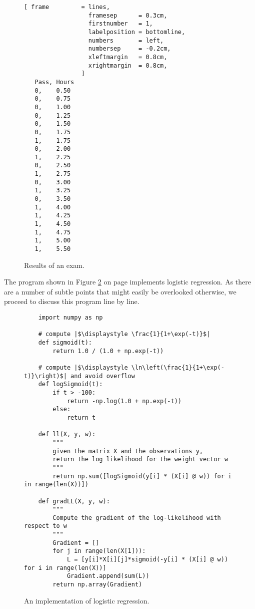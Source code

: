\begin{figure}[!ht]
\centering
\begin{Verbatim}[ frame         = lines, 
                  framesep      = 0.3cm, 
                  firstnumber   = 1,
                  labelposition = bottomline,
                  numbers       = left,
                  numbersep     = -0.2cm,
                  xleftmargin   = 0.8cm,
                  xrightmargin  = 0.8cm,
                ]
   Pass, Hours
   0,    0.50
   0,    0.75
   0,    1.00
   0,    1.25
   0,    1.50
   0,    1.75
   1,    1.75
   0,    2.00
   1,    2.25
   0,    2.50
   1,    2.75
   0,    3.00
   1,    3.25
   0,    3.50
   1,    4.00
   1,    4.25
   1,    4.50
   1,    4.75
   1,    5.00
   1,    5.50
\end{Verbatim}
\vspace*{-0.3cm}
\caption{Results of an exam.}
\label{fig:exam.csv}
\end{figure}

The program shown in Figure \ref{fig:logistic_regression.py} on page
\pageref{fig:logistic_regression.py} implements logistic regression.  As there are a number of
subtle points that might easily be overlooked otherwise, we proceed to discuss this program line by line. 


\begin{figure}[!ht]
\centering

\begin{verbatim}
    import numpy as np
    
    # compute |$\displaystyle \frac{1}{1+\exp(-t)}$|
    def sigmoid(t):
        return 1.0 / (1.0 + np.exp(-t))
    
    # compute |$\displaystyle \ln\left(\frac{1}{1+\exp(-t)}\right)$| and avoid overflow
    def logSigmoid(t):
        if t > -100:
            return -np.log(1.0 + np.exp(-t))
        else:
            return t
    
    def ll(X, y, w):
        """
        given the matrix X and the observations y,
        return the log likelihood for the weight vector w
        """
        return np.sum([logSigmoid(y[i] * (X[i] @ w)) for i in range(len(X))])
    
    def gradLL(X, y, w):
        """
        Compute the gradient of the log-likelihood with respect to w 
        """
        Gradient = []
        for j in range(len(X[1])):
            L = [y[i]*X[i][j]*sigmoid(-y[i] * (X[i] @ w)) for i in range(len(X))]
            Gradient.append(sum(L))
        return np.array(Gradient)
\end{verbatim}

\caption{An implementation of logistic regression.}
\label{fig:logistic_regression.py}
\end{figure}



